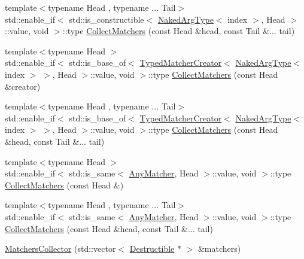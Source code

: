 \begin{DoxyCompactItemize}
\item 
{\footnotesize template$<$typename Head , typename ... Tail$>$ }\\std\+::enable\+\_\+if$<$ std\+::is\+\_\+constructible$<$ \mbox{\hyperlink{classfakeit_1_1MatchersCollector_aeda8ced6a2f0cb7c6e4f916f18a91730}{Naked\+Arg\+Type}}$<$ index $>$, Head $>$\+::value, void $>$\+::type \mbox{\hyperlink{classfakeit_1_1MatchersCollector_a29c5245d03b8fab3773455c087edde74}{Collect\+Matchers}} (const Head \&head, const Tail \&... tail)
\item 
{\footnotesize template$<$typename Head $>$ }\\std\+::enable\+\_\+if$<$ std\+::is\+\_\+base\+\_\+of$<$ \mbox{\hyperlink{structfakeit_1_1TypedMatcherCreator}{Typed\+Matcher\+Creator}}$<$ \mbox{\hyperlink{classfakeit_1_1MatchersCollector_aeda8ced6a2f0cb7c6e4f916f18a91730}{Naked\+Arg\+Type}}$<$ index $>$ $>$, Head $>$\+::value, void $>$\+::type \mbox{\hyperlink{classfakeit_1_1MatchersCollector_ae954aa74286bcd096169067f5e897356}{Collect\+Matchers}} (const Head \&creator)
\item 
{\footnotesize template$<$typename Head , typename ... Tail$>$ }\\std\+::enable\+\_\+if$<$ std\+::is\+\_\+base\+\_\+of$<$ \mbox{\hyperlink{structfakeit_1_1TypedMatcherCreator}{Typed\+Matcher\+Creator}}$<$ \mbox{\hyperlink{classfakeit_1_1MatchersCollector_aeda8ced6a2f0cb7c6e4f916f18a91730}{Naked\+Arg\+Type}}$<$ index $>$ $>$, Head $>$\+::value, void $>$\+::type \mbox{\hyperlink{classfakeit_1_1MatchersCollector_a40994e9802e933fb1bae91870d666dcb}{Collect\+Matchers}} (const Head \&head, const Tail \&... tail)
\item 
{\footnotesize template$<$typename Head $>$ }\\std\+::enable\+\_\+if$<$ std\+::is\+\_\+same$<$ \mbox{\hyperlink{structfakeit_1_1AnyMatcher}{Any\+Matcher}}, Head $>$\+::value, void $>$\+::type \mbox{\hyperlink{classfakeit_1_1MatchersCollector_a89350af9ba2e7aaead8bd7b007f03631}{Collect\+Matchers}} (const Head \&)
\item 
{\footnotesize template$<$typename Head , typename ... Tail$>$ }\\std\+::enable\+\_\+if$<$ std\+::is\+\_\+same$<$ \mbox{\hyperlink{structfakeit_1_1AnyMatcher}{Any\+Matcher}}, Head $>$\+::value, void $>$\+::type \mbox{\hyperlink{classfakeit_1_1MatchersCollector_a5bc97a3d729b1bb67e372181ad88b77d}{Collect\+Matchers}} (const Head \&head, const Tail \&... tail)
\item 
\mbox{\hyperlink{classfakeit_1_1MatchersCollector_ac5e0254e23626d189f329de8051137a6}{Matchers\+Collector}} (std\+::vector$<$ \mbox{\hyperlink{classfakeit_1_1Destructible}{Destructible}} $\ast$ $>$ \&matchers)

\end{DoxyCompactItemize}
